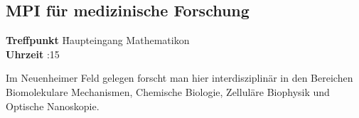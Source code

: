 \hochruecken
\subsection*{MPI für medizinische Forschung}
\begin{tabbing}
\textbf{Treffpunkt} \quad \quad \quad \= Haupteingang Mathematikon\\
\textbf{Uhrzeit} :15
\end{tabbing}
\hochruecken
Im Neuenheimer Feld gelegen forscht man hier interdisziplinär in den Bereichen Biomolekulare Mechanismen, Chemische Biologie, Zelluläre Biophysik und Optische Nanoskopie. 